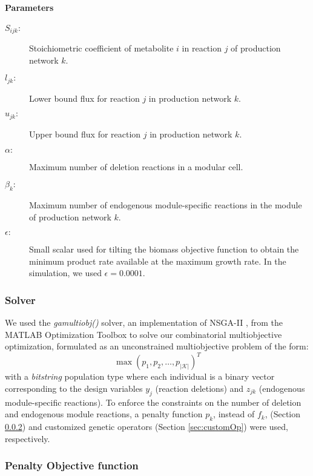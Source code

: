 \paragraph{Parameters}
\begin{description}
\item[$S_{ijk}:$] Stoichiometric coefficient of metabolite $i$ in reaction $j$ of production network $k$.
\item[$l_{jk}:$] Lower bound flux for reaction $j$ in production network $k$.
\item[$u_{jk}:$] Upper bound flux for reaction $j$ in production network $k$.
\item[$\alpha:$] Maximum number of deletion reactions in a modular cell.
\item[$\beta_k:$] Maximum number of endogenous module-specific reactions in the module of production network $k$.
\item[$\epsilon:$] Small scalar used for tilting the biomass objective function to obtain the minimum product rate available at the maximum growth rate. In the simulation, we used $\epsilon=0.0001$.
\end{description}

\subsubsection{Solver} \label{sec:mainMOP}
We used the \textit{gamultiobj()} solver, an implementation of NSGA-II \cite{Deb2002}, from the MATLAB Optimization Toolbox to solve our combinatorial multiobjective optimization, formulated as an unconstrained multiobjective problem of
the form:
\begin{equation}
\max (p_1,p_2,\dots ,p_{|\mathcal{K}|})^T
\end{equation}
with a \textit{bitstring} population type where each individual is a binary vector corresponding to the design variables $y_j$ (reaction deletions) and $z_{jk}$ (endogenous module-specific reactions). To enforce the constraints on the number of deletion and endogenous module reactions, a penalty function $p_k$, instead of $f_k$, (Section \ref{sec:penalty}) and customized genetic operators (Section \ref{sec:customOp}) were used, respectively. %

\subsubsection{Penalty Objective function} \label{sec:penalty}

